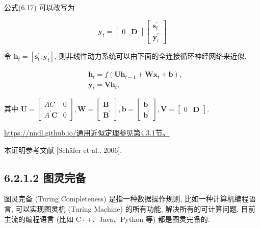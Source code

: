 \documentclass[10pt]{article}
\begin{document}
公式(6.17) 可以改写为

\[
\boldsymbol{y}_{t}=\left[\begin{array}{ll}
0 & \mathbf{D}
\end{array}\right]\left[\begin{array}{c}
\boldsymbol{s}_{t}^{\prime}  \tag{6.19}\\
\boldsymbol{y}_{t}^{\prime}
\end{array}\right]
\]

令 $\boldsymbol{h}_{t}=\left[\boldsymbol{s}_{t}^{\prime} ; \boldsymbol{y}_{t}^{\prime}\right]$, 则非线性动力系统可以由下面的全连接循环神经网络来近似.


\begin{align*}
& \boldsymbol{h}_{t}=f\left(\boldsymbol{U} \boldsymbol{h}_{t-1}+\boldsymbol{W} \boldsymbol{x}_{t}+\boldsymbol{b}\right),  \tag{6.20}\\
& \boldsymbol{y}_{t}=\boldsymbol{V} \boldsymbol{h}_{t}, \tag{6.21}
\end{align*}


其中 $\boldsymbol{U}=\left[\begin{array}{cc}A C & 0 \\ A^{\prime} \boldsymbol{C} & 0\end{array}\right], \boldsymbol{W}=\left[\begin{array}{l}\boldsymbol{B} \\ \boldsymbol{B}^{\prime}\end{array}\right], \boldsymbol{b}=\left[\begin{array}{l}\boldsymbol{b} \\ \boldsymbol{b}^{\prime}\end{array}\right], \boldsymbol{V}=\left[\begin{array}{ll}0 & \boldsymbol{D}\end{array}\right]$.

\href{https://nndl.github.io/%E9%80%9A%E7%94%A8%E8%BF%91%E4%BC%BC%E5%AE%9A%E7%90%86%E5%8F%82%E8%A7%81%E7%AC%AC4.3.1%E8%8A%82%E3%80%82}{https://nndl.github.io/通用近似定理参见第4.3.1节。}

本证明参考文献 [Schäfer et al., 2006].

\subsection*{6.2.1.2 图灵完备}
图灵完备 (Turing Completeness) 是指一种数据操作规则, 比如一种计算机编程语言, 可以实现图灵机 (Turing Machine) 的所有功能, 解决所有的可计算问题. 目前主流的编程语言 (比如 C++、Java、Python 等) 都是图灵完备的.
\end{document}
